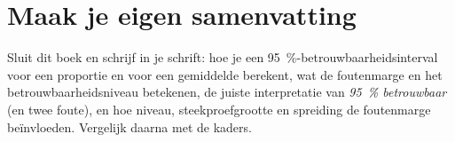 
\begin{oefeningen}






\end{oefeningen}


\ifzelfstudie
\section*{Maak je eigen samenvatting}
Sluit dit boek en schrijf in je schrift: hoe je een 95~\%-betrouwbaarheidsinterval voor een proportie en voor een gemiddelde berekent, wat de foutenmarge en het betrouwbaarheidsniveau betekenen, de juiste interpretatie van \textit{95~\% betrouwbaar} (en twee foute), en hoe niveau, steekproefgrootte en spreiding de foutenmarge beïnvloeden. Vergelijk daarna met de kaders.
\fi
